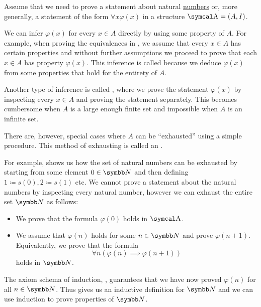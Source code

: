 \begin{remark}\label{remark:induction}
  Assume that we need to prove a statement about natural \hyperref[def:natural_numbers]{numbers} or, more generally, a statement of the form \( \forall x \varphi(x) \) in a structure \( \CA = (A, I) \).

  We can infer \( \varphi(x) \) for every \( x \in A \) directly by using some property of \( A \). For example, when proving the equivalences in , we assume that every \( x \in A \) has certain properties and without further assumptions we proceed to prove that each \( x \in A \) has property \( \varphi(x) \). This inference is called  because we deduce \( \varphi(x) \) from some properties that hold for the entirety of \( A \).

  Another type of inference is called , where we prove the statement \( \varphi(x) \) by inspecting every \( x \in A \) and proving the statement separately. This becomes cumbersome when \( A \) is a large enough finite set and impossible when \( A \) is an infinite set.

  There are, however, special cases where \( A \) can be \enquote{exhausted} using a simple procedure. This method of exhausting is called an .

  For example,  shows us how the set of natural numbers can be exhausted by starting from some element \( 0 \in \BN \) and then defining \( 1 \coloneqq s(0), 2 \coloneqq s(1) \) etc. We cannot prove a statement about the natural numbers by inspecting every natural number, however we can exhaust the entire set \( \BN \) as follows:
  \begin{itemize}
    \item We prove that the formula \( \varphi(0) \) holds in \( \CA \).
    \item We assume that \( \varphi(n) \) holds for some \( n \in \BN \) and prove \( \varphi(n + 1) \). Equivalently, we prove that the formula
    \begin{equation*}
      \forall n (\varphi(n) \implies \varphi(n + 1))
    \end{equation*}
    holds in \( \BN \).
  \end{itemize}

  The axiom schema of induction, , guarantees that we have now proved \( \varphi(n) \) for all \( n \in \BN \). Thus  gives us an inductive definition for \( \BN \) and we can use induction to prove properties of \( \BN \).


\end{remark}

